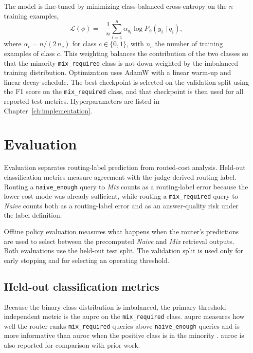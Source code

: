 \documentclass[english, bibtex]{kththesis}               %
\numberwithin{listing}{chapter}
\begin{document}
The model is fine-tuned by minimizing class-balanced cross-entropy on the \(n\) training examples,
\begin{equation}
\label{eq:modernBertLoss}
\mathcal{L}(\phi)
=
-\frac{1}{n}\sum_{i=1}^{n}
\alpha_{y_i} \log P_\phi(y_i \mid q_i),
\end{equation}
where \(\alpha_{c} = n / (2\,n_c)\) for class \(c \in \{0, 1\}\), with \(n_c\) the number of training examples of class \(c\). This weighting balances the contribution of the two classes so that the minority \texttt{mix\_required} class is not down-weighted by the imbalanced training distribution. Optimization uses AdamW \cite{loshchilov2019decoupled} with a linear warm-up and linear decay schedule. The best checkpoint is selected on the validation split using the F1 score on the \texttt{mix\_required} class, and that checkpoint is then used for all reported test metrics. Hyperparameters are listed in Chapter~\ref{ch:implementation}.

\section{Evaluation}
\label{sec:methodEvaluation}

Evaluation separates routing-label prediction from routed-cost analysis. Held-out classification metrics measure agreement with the judge-derived routing label. Routing a \texttt{naive\_enough} query to \emph{Mix} counts as a routing-label error because the lower-cost mode was already sufficient, while routing a \texttt{mix\_required} query to \emph{Naive} counts both as a routing-label error and as an answer-quality risk under the label definition.

Offline policy evaluation measures what happens when the router's predictions are used to select between the precomputed \emph{Naive} and \emph{Mix} retrieval outputs. Both evaluations use the held-out test split. The validation split is used only for early stopping and for selecting an operating threshold.

\subsection{Held-out classification metrics}
\label{sec:methodHeldOut}

Because the binary class distribution is imbalanced, the primary threshold-independent metric is the \gls{auprc} on the \texttt{mix\_required} class. \Gls{auprc} measures how well the router ranks \texttt{mix\_required} queries above \texttt{naive\_enough} queries and is more informative than \gls{auroc} when the positive class is in the minority \cite{saito2015precision}. \Gls{auroc} is also reported for comparison with prior work.
\end{document}

